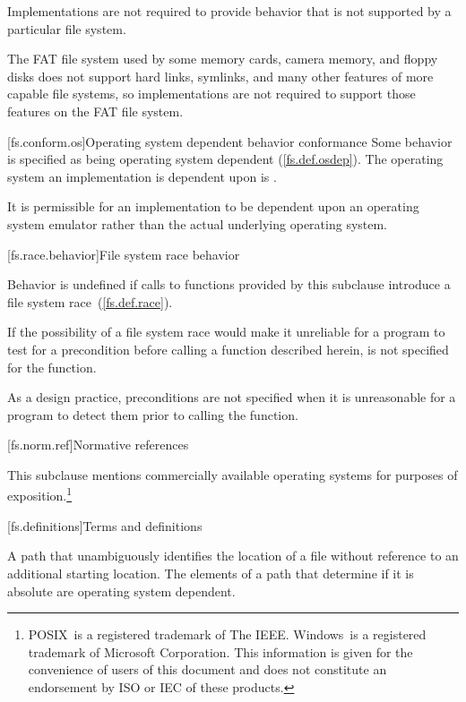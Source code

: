 \pnum
Implementations are not required to provide behavior that is not supported by
a particular file system.
\begin{example} The FAT file system used by some memory cards, camera memory, and
floppy disks does not support hard links, symlinks, and many other features of
more capable file systems, so implementations are not required to support those
features on the FAT file system. \end{example}

[fs.conform.os]{Operating system dependent behavior conformance}
\pnum
Some behavior is specified as being
operating system dependent (\ref{fs.def.osdep}). The operating system an
implementation is dependent upon is
.

\pnum
It is permissible for an implementation to be dependent upon an operating
system emulator rather than the actual underlying operating system.

[fs.race.behavior]{File system race behavior}

\pnum
Behavior is undefined if calls to functions provided by this subclause introduce a file system race~(\ref{fs.def.race}).

\pnum
If the possibility of a file system race would make it unreliable for a
program to test for a precondition before calling a function described herein,
\requires is not specified for the function.
\begin{note} As a design practice, preconditions are not specified when it
is unreasonable for a program to detect them prior to calling the function.
\end{note}

[fs.norm.ref]{Normative references}

\pnum
This subclause mentions commercially
available operating systems for purposes of exposition.\footnote{
POSIX\textregistered\ is a registered trademark of The IEEE.
Windows\textregistered\ is a registered trademark of Microsoft Corporation.
This information is given for the convenience of users of this document and
does not constitute an endorsement by ISO or IEC of these
products.
}

[fs.definitions]{Terms and definitions}

A path that unambiguously
identifies the location of a file without reference to an additional starting
location. The elements of a path that determine if it is absolute are
operating system dependent.

